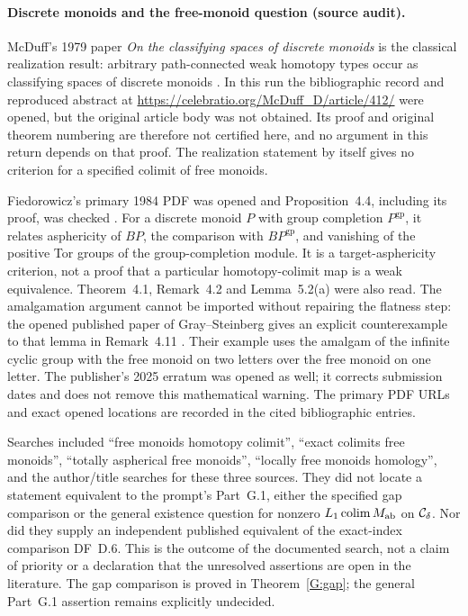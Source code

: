 \paragraph{Discrete monoids and the free-monoid question (source audit).}
McDuff's 1979 paper \emph{On the classifying spaces of discrete
monoids} is the classical realization result: arbitrary
path-connected weak homotopy types occur as classifying spaces
of discrete monoids \cite{GMcDuff1979}.  In this run the
bibliographic record and reproduced abstract at
\url{https://celebratio.org/McDuff_D/article/412/} were opened,
but the original article body was not obtained.  Its proof and
original theorem numbering are therefore not certified here,
and no argument in this return depends on that proof.  The
realization statement by itself gives no criterion for a
specified colimit of free monoids.

Fiedorowicz's primary 1984 PDF was opened and Proposition~4.4,
including its proof, was checked \cite{GFiedorowicz1984}.
For a discrete monoid $P$ with group completion $P^{\mathrm{gp}}$,
it relates asphericity of $BP$, the comparison with
$BP^{\mathrm{gp}}$, and vanishing of the positive Tor groups
of the group-completion module.  It is a target-asphericity
criterion, not a proof that a particular homotopy-colimit map
is a weak equivalence.  Theorem~4.1, Remark~4.2 and
Lemma~5.2(a) were also read.  The amalgamation argument cannot
be imported without repairing the flatness step: the opened
published paper of Gray--Steinberg gives an explicit
counterexample to that lemma in Remark~4.11
\cite{GGraySteinberg2024}.  Their example uses the amalgam of
the infinite cyclic group with the free monoid on two letters
over the free monoid on one letter.  The publisher's 2025
erratum was opened as well; it corrects submission dates and
does not remove this mathematical warning.  The primary PDF
URLs and exact opened locations are recorded in the cited
bibliographic entries.

Searches included ``free monoids homotopy colimit'', ``exact
colimits free monoids'', ``totally aspherical free monoids'',
``locally free monoids homology'', and the author/title searches
for these three sources.  They did not locate a statement
equivalent to the prompt's Part~G.1, either the specified gap
comparison or the general existence question for nonzero
$L_1\operatorname*{colim} M_{\mathrm{ab}}$ on $\mathcal C_\delta$.
Nor did they supply an independent published equivalent of the
exact-index comparison DF~D.6.  This is the outcome of the
documented search, not a claim of priority or a declaration
that the unresolved assertions are open in the literature.
The gap comparison is proved in Theorem~\ref{G:gap}; the
general Part~G.1 assertion remains explicitly undecided.
